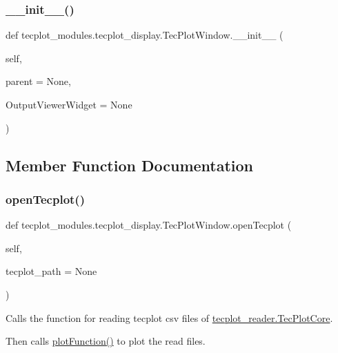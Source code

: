 \subsubsection{\texorpdfstring{\+\_\+\+\_\+init\+\_\+\+\_\+()}{\_\_init\_\_()}}
{\footnotesize\ttfamily def tecplot\+\_\+modules.\+tecplot\+\_\+display.\+Tec\+Plot\+Window.\+\_\+\+\_\+init\+\_\+\+\_\+ (\begin{DoxyParamCaption}\item[{}]{self,  }\item[{}]{parent = {\ttfamily None},  }\item[{}]{Output\+Viewer\+Widget = {\ttfamily None} }\end{DoxyParamCaption})}



\subsection{Member Function Documentation}
\hypertarget{classtecplot__modules_1_1tecplot__display_1_1_tec_plot_window_a6b4350a2c6ee537dba6bbe1549778636}{}\label{classtecplot__modules_1_1tecplot__display_1_1_tec_plot_window_a6b4350a2c6ee537dba6bbe1549778636} 
\subsubsection{\texorpdfstring{open\+Tecplot()}{openTecplot()}}
{\footnotesize\ttfamily def tecplot\+\_\+modules.\+tecplot\+\_\+display.\+Tec\+Plot\+Window.\+open\+Tecplot (\begin{DoxyParamCaption}\item[{}]{self,  }\item[{}]{tecplot\+\_\+path = {\ttfamily None} }\end{DoxyParamCaption})}



Calls the function for reading tecplot csv files of \hyperlink{classtecplot__modules_1_1tecplot__reader_1_1_tec_plot_core}{tecplot\+\_\+reader.\+Tec\+Plot\+Core}. 

Then calls \hyperlink{classtecplot__modules_1_1tecplot__display_1_1_tec_plot_window_a62c9724fbeda8d8780e57559bada3282}{plot\+Function()} to plot the read files.

